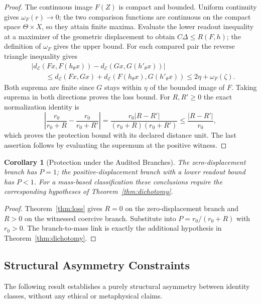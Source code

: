 \documentclass[11pt,a4paper]{article}
\theoremstyle{plain}
\newtheorem{corollary}[theorem]{Corollary}
\theoremstyle{definition}
\theoremstyle{remark}
\begin{document}
\begin{proof}
The continuous image $F(Z)$ is compact and bounded. Uniform continuity gives
$\omega_F(r)\to0$; the two comparison functions are continuous on the compact
space $\Theta\times X$, so they attain finite maxima. Evaluate the lower
readout inequality at a maximizer of the geometric displacement to obtain
$C\Delta\leq R(F,h)$; the definition of $\omega_F$ gives the upper bound.
For each compared pair the reverse triangle inequality gives
\[
\begin{aligned}
 &\bigl|d_{\mathcal E}(Fx,F(h_\theta x))
       -d_{\mathcal E}(Gx,G(h'_\theta x))\bigr|\\
 &\qquad\leq d_{\mathcal E}(Fx,Gx)
        +d_{\mathcal E}(F(h_\theta x),G(h'_\theta x))
 \leq2\eta+\omega_F(\zeta).
\end{aligned}
\]
Both suprema are finite since $G$ stays within $\eta$ of the bounded image
of $F$. Taking suprema in both directions proves the loss bound. For
$R,R'\geq0$ the exact normalization identity is
\[
 \left|\frac{r_0}{r_0+R}-\frac{r_0}{r_0+R'}\right|
 =\frac{r_0|R-R'|}{(r_0+R)(r_0+R')}
 \leq\frac{|R-R'|}{r_0},
\]
which proves the protection bound with its declared distance unit.
The last assertion follows by evaluating the supremum at the positive witness.
\end{proof}

\begin{corollary}[Protection under the Audited Branches]\label{cor:protection}
The zero-displacement branch has $P=1$; the positive-displacement branch with a lower readout bound has $P<1$. For a mass-based classification these conclusions require the corresponding hypotheses of Theorem~\ref{thm:dichotomy}.
\end{corollary}

\begin{proof}
Theorem~\ref{thm:loss} gives $R=0$ on the zero-displacement branch and
$R>0$ on the witnessed coercive branch. Substitute into
$P=r_0/(r_0+R)$ with $r_0>0$. The branch-to-mass link is exactly the
additional hypothesis in Theorem~\ref{thm:dichotomy}.
\end{proof}

\subsection{Structural Asymmetry Constraints}

The following result establishes a purely structural asymmetry between identity classes, without any ethical or metaphysical claims.
\end{document}
